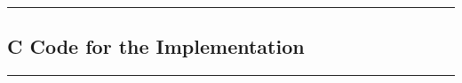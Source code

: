 \documentclass[a4paper,11pt]{article}%
\begin{document}
\vfill
\hrule
\vspace{0.5cm}

\begin{appendices}
	\section{C Code for the Implementation}
	

	
\end{appendices}


\vspace{1cm}
\hrule
\vspace{0.5cm}


\end{document}
